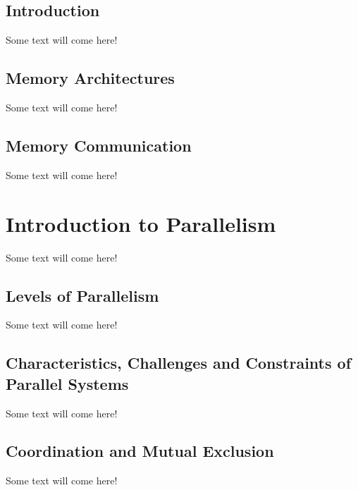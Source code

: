 \subsection{Introduction} %
Some text will come here! \\
\subsection{Memory Architectures} %
Some text will come here! \\
\subsection{Memory Communication} %
Some text will come here! \\
\section{Introduction to Parallelism} 
Some text will come here! \\
\subsection{Levels of Parallelism}
Some text will come here! \\
\subsection{Characteristics, Challenges and Constraints of Parallel Systems} %
Some text will come here! \\
\subsection{Coordination and Mutual Exclusion}
Some text will come here! \\
